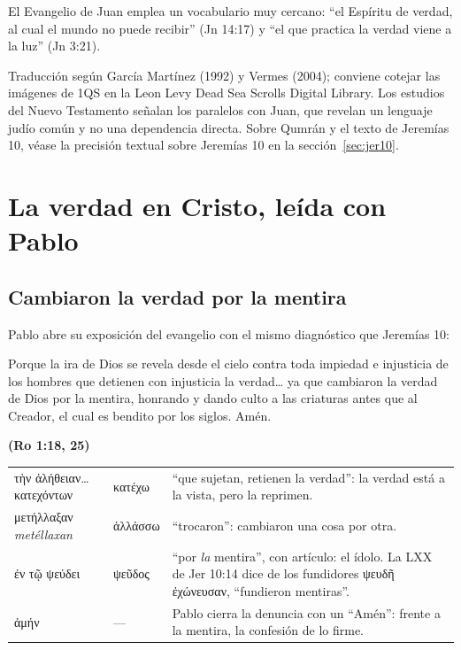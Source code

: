 \documentclass[11pt,letterpaper]{article}
\newcommand{\grc}[1]{\foreignlanguage{ancientgreek}{#1}}
\newcommand{\fuente}[1]{\par\hfill{\upshape\bfseries\small\textcolor{azul}{#1}}}
\begin{document}
El Evangelio de Juan emplea un vocabulario muy cercano: ``el Espíritu de verdad, al cual el mundo no puede recibir'' (Jn 14:17) y ``el que practica la verdad viene a la luz'' (Jn 3:21).

\begin{nota}[Precisión]
Traducción según García Martínez (1992) y Vermes (2004); conviene cotejar las imágenes de 1QS en la Leon Levy Dead Sea Scrolls Digital Library. Los estudios del Nuevo Testamento señalan los paralelos con Juan, que revelan un lenguaje judío común y no una dependencia directa. Sobre Qumrán y el texto de Jeremías 10, véase la precisión textual sobre Jeremías 10 en la sección~\ref{sec:jer10}.
\end{nota}

\section{La verdad en Cristo, leída con Pablo}\label{sec:cristo-verdad}

\subsection{Cambiaron la verdad por la mentira}
Pablo abre su exposición del evangelio con el mismo diagnóstico que Jeremías 10:

\begin{cita}Porque la ira de Dios se revela desde el cielo contra toda impiedad e injusticia de los hombres que detienen con injusticia la verdad\ldots{} ya que cambiaron la verdad de Dios por la mentira, honrando y dando culto a las criaturas antes que al Creador, el cual es bendito por los siglos. Amén.\fuente{(Ro 1:18, 25)}\end{cita}

\begin{filologia}[Ro 1:18, 25]
\begin{tabular}{@{}L{3.2cm}L{1.6cm}L{10cm}@{}}
\grc{τὴν ἀλήθειαν\ldots{} κατεχόντων} & \grc{κατέχω} & ``que sujetan, retienen la verdad'': la verdad está a la vista, pero la reprimen. \\[2pt]
\grc{μετήλλαξαν} \emph{metéllaxan} & \grc{ἀλλάσσω} & ``trocaron'': cambiaron una cosa por otra. \\[2pt]
\grc{ἐν τῷ ψεύδει} & \grc{ψεῦδος} & ``por \emph{la} mentira'', con artículo: el ídolo. La LXX de Jer 10:14 dice de los fundidores \grc{ψευδῆ ἐχώνευσαν}, ``fundieron mentiras''. \\[2pt]
\grc{ἀμήν} & --- & Pablo cierra la denuncia con un ``Amén'': frente a la mentira, la confesión de lo firme. \\
\end{tabular}
\end{filologia}
\end{document}
